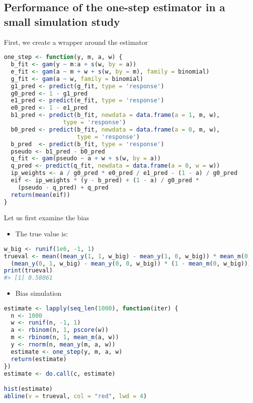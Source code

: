 \documentclass[
  12pt,
]{book}
\providecommand{\tightlist}{%
  \setlength{\itemsep}{0pt}\setlength{\parskip}{0pt}}
\theoremstyle{definition}
\theoremstyle{definition}
\theoremstyle{definition}
\newcommand{\1}{\mathbbm{1}}
\begin{document}
\hypertarget{performance-of-the-one-step-estimator-in-a-small-simulation-study}{%
\subsection{Performance of the one-step estimator in a small simulation study}\label{performance-of-the-one-step-estimator-in-a-small-simulation-study}}

First, we create a wrapper around the estimator

\begin{lstlisting}[language=R]
one_step <- function(y, m, a, w) {
  b_fit <- gam(y ~ m:a + s(w, by = a))
  e_fit <- gam(a ~ m + w + s(w, by = m), family = binomial)
  g_fit <- gam(a ~ w, family = binomial)
  g1_pred <- predict(g_fit, type = 'response')
  g0_pred <- 1 - g1_pred
  e1_pred <- predict(e_fit, type = 'response')
  e0_pred <- 1 - e1_pred
  b1_pred <- predict(b_fit, newdata = data.frame(a = 1, m, w),
                 type = 'response')
  b0_pred <- predict(b_fit, newdata = data.frame(a = 0, m, w),
                     type = 'response')
  b_pred  <- predict(b_fit, type = 'response')
  pseudo <- b1_pred - b0_pred
  q_fit <- gam(pseudo ~ a + w + s(w, by = a))
  q_pred <- predict(q_fit, newdata = data.frame(a = 0, w = w))
  ip_weights <- a / g0_pred * e0_pred / e1_pred - (1 - a) / g0_pred
  eif <- ip_weights * (y - b_pred) + (1 - a) / g0_pred *
    (pseudo - q_pred) + q_pred
  return(mean(eif))
}
\end{lstlisting}

Let us first examine the bias

\begin{itemize}
\tightlist
\item
  The true value is:
\end{itemize}

\begin{lstlisting}[language=R]
w_big <- runif(1e6, -1, 1)
trueval <- mean((mean_y(1, 1, w_big) - mean_y(1, 0, w_big)) * mean_m(0, w_big) +
  (mean_y(0, 1, w_big) - mean_y(0, 0, w_big)) * (1 - mean_m(0, w_big)))
print(trueval)
#> [1] 0.58061
\end{lstlisting}

\begin{itemize}
\tightlist
\item
  Bias simulation
\end{itemize}

\begin{lstlisting}[language=R]
estimate <- lapply(seq_len(1000), function(iter) {
  n <- 1000
  w <- runif(n, -1, 1)
  a <- rbinom(n, 1, pscore(w))
  m <- rbinom(n, 1, mean_m(a, w))
  y <- rnorm(n, mean_y(m, a, w))
  estimate <- one_step(y, m, a, w)
  return(estimate)
})
estimate <- do.call(c, estimate)

hist(estimate)
abline(v = trueval, col = "red", lwd = 4)
\end{lstlisting}
\end{document}
